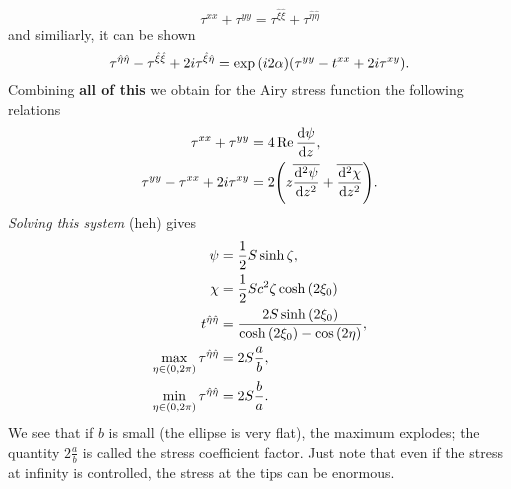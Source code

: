\documentclass[reqno, a4paper]{article}
\begin{document}
\[
	\tau^{xx}+\tau^{yy}=\tau^{\hat{\xi}\hat{\xi}}+\tau^{\hat{\eta}\hat{\eta}}
\]
and similiarly, it can be shown
\[
	\tau^{\hat{\eta}\hat{\eta}}-\tau^{\hat{\xi}\hat{\xi}}+2i \tau^{\hat{\xi}\hat{\eta}} = \exp\qty(i 2 \alpha)\qty(\tau^{yy}-t^{xx}+2i \tau^{xy}).
\]
Combining \textbf{all of this} we obtain for the Airy stress function the following relations 
\begin{align*}
	\tau^{xx} + \tau^{yy} &= 4 \Re \dv{\psi}{z},\\
	\tau^{yy} - \tau^{xx} + 2 i \tau^{xy} &= 2\qty(z \overline{\dv[2]{\psi}{z}} + \overline{\dv[2]{\chi}{z}}).
\end{align*}
\textit{Solving this system} (heh) gives 
\begin{align*}
	\psi &= \frac{1}{2}S \sinh \zeta, \\
	\chi & = \frac{1}{2}S c^{2} \zeta \cosh\qty(2 \xi_0) \\
	t^{\hat{\eta}\hat{\eta}} &= \frac{2 S \sinh \qty(2\xi_0)}{\cosh\qty(2 \xi_0) - \cos \qty(2 \eta)}, \\
	\max_{\eta \in (0,2 \pi)} \tau^{\hat{\eta}\hat{\eta}} &= 2 S \frac{a}{b}, \\
	\min_{\eta \in (0,2 \pi)} \tau^{\hat{\eta}\hat{\eta}} &= 2 S \frac{b}{a}.
\end{align*}
We see that if $b$ is small (the ellipse is very flat), the maximum explodes; the quantity $2\frac{a}{b}$ is called the stress coefficient factor. Just note that even if the stress at infinity is controlled, the stress at the tips can be enormous.
\end{document}
